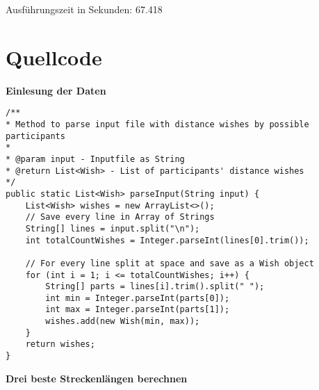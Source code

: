\documentclass[a4paper,10pt,ngerman]{scrartcl}
\begin{document}
\begin{itemize}
  Ausführungszeit in Sekunden: 67.418
\end{itemize}

\section{Quellcode}
\textbf{Einlesung der Daten}
\begin{lstlisting}
/**
* Method to parse input file with distance wishes by possible participants
* 
* @param input - Inputfile as String
* @return List<Wish> - List of participants' distance wishes
*/
public static List<Wish> parseInput(String input) {
    List<Wish> wishes = new ArrayList<>();
    // Save every line in Array of Strings
    String[] lines = input.split("\n");
    int totalCountWishes = Integer.parseInt(lines[0].trim());

    // For every line split at space and save as a Wish object
    for (int i = 1; i <= totalCountWishes; i++) {
        String[] parts = lines[i].trim().split(" ");
        int min = Integer.parseInt(parts[0]);
        int max = Integer.parseInt(parts[1]);
        wishes.add(new Wish(min, max));
    }
    return wishes;
}
\end{lstlisting}
\textbf{Drei beste Streckenlängen berechnen}
\end{document}
